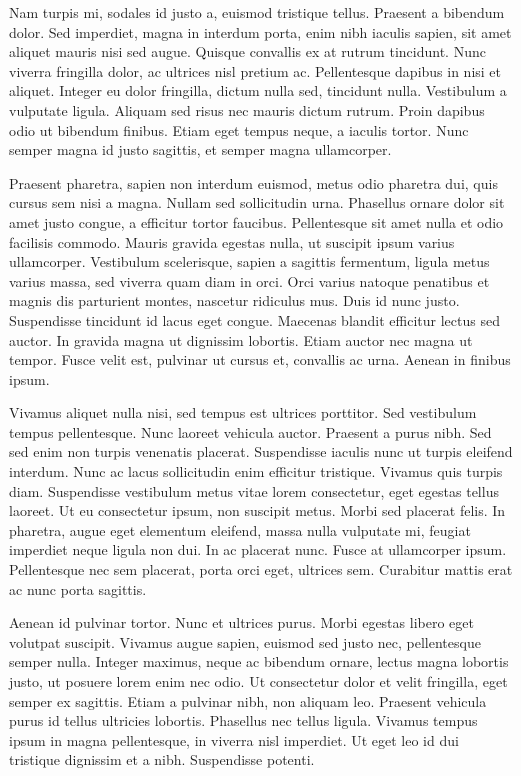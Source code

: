 \documentclass{article}
\begin{document}
Nam turpis mi, sodales id justo a, euismod tristique tellus. Praesent a bibendum dolor. Sed imperdiet, magna in interdum porta, enim nibh iaculis sapien, sit amet aliquet mauris nisi sed augue. Quisque convallis ex at rutrum tincidunt. Nunc viverra fringilla dolor, ac ultrices nisl pretium ac. Pellentesque dapibus in nisi et aliquet. Integer eu dolor fringilla, dictum nulla sed, tincidunt nulla. Vestibulum a vulputate ligula. Aliquam sed risus nec mauris dictum rutrum. Proin dapibus odio ut bibendum finibus. Etiam eget tempus neque, a iaculis tortor. Nunc semper magna id justo sagittis, et semper magna ullamcorper.

Praesent pharetra, sapien non interdum euismod, metus odio pharetra dui, quis cursus sem nisi a magna. Nullam sed sollicitudin urna. Phasellus ornare dolor sit amet justo congue, a efficitur tortor faucibus. Pellentesque sit amet nulla et odio facilisis commodo. Mauris gravida egestas nulla, ut suscipit ipsum varius ullamcorper. Vestibulum scelerisque, sapien a sagittis fermentum, ligula metus varius massa, sed viverra quam diam in orci. Orci varius natoque penatibus et magnis dis parturient montes, nascetur ridiculus mus. Duis id nunc justo. Suspendisse tincidunt id lacus eget congue. Maecenas blandit efficitur lectus sed auctor. In gravida magna ut dignissim lobortis. Etiam auctor nec magna ut tempor. Fusce velit est, pulvinar ut cursus et, convallis ac urna. Aenean in finibus ipsum.

Vivamus aliquet nulla nisi, sed tempus est ultrices porttitor. Sed vestibulum tempus pellentesque. Nunc laoreet vehicula auctor. Praesent a purus nibh. Sed sed enim non turpis venenatis placerat. Suspendisse iaculis nunc ut turpis eleifend interdum. Nunc ac lacus sollicitudin enim efficitur tristique. Vivamus quis turpis diam. Suspendisse vestibulum metus vitae lorem consectetur, eget egestas tellus laoreet. Ut eu consectetur ipsum, non suscipit metus. Morbi sed placerat felis. In pharetra, augue eget elementum eleifend, massa nulla vulputate mi, feugiat imperdiet neque ligula non dui. In ac placerat nunc. Fusce at ullamcorper ipsum. Pellentesque nec sem placerat, porta orci eget, ultrices sem. Curabitur mattis erat ac nunc porta sagittis.

Aenean id pulvinar tortor. Nunc et ultrices purus. Morbi egestas libero eget volutpat suscipit. Vivamus augue sapien, euismod sed justo nec, pellentesque semper nulla. Integer maximus, neque ac bibendum ornare, lectus magna lobortis justo, ut posuere lorem enim nec odio. Ut consectetur dolor et velit fringilla, eget semper ex sagittis. Etiam a pulvinar nibh, non aliquam leo. Praesent vehicula purus id tellus ultricies lobortis. Phasellus nec tellus ligula. Vivamus tempus ipsum in magna pellentesque, in viverra nisl imperdiet. Ut eget leo id dui tristique dignissim et a nibh. Suspendisse potenti.
\end{document}
